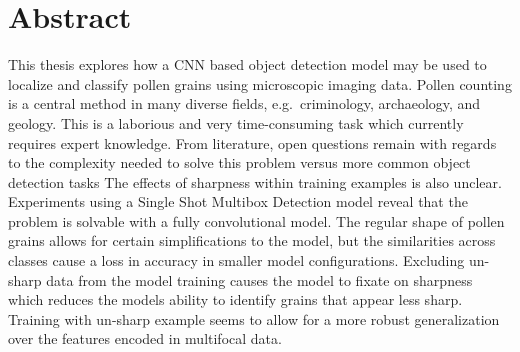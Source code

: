 \chapter*{Abstract}
This thesis explores how a CNN based object detection model may be used to localize and classify pollen grains using microscopic imaging data.
Pollen counting is a central method in many diverse fields, e.g.\ criminology, archaeology, and geology.
This is a laborious and very time-consuming task which currently requires expert knowledge.
From literature, open questions remain with regards to the complexity needed to solve this problem versus more common object detection tasks
The effects of sharpness within training examples is also unclear.
Experiments using a Single Shot Multibox Detection model reveal that the problem is solvable with a fully convolutional model.
The regular shape of pollen grains allows for certain simplifications to the model, but the similarities across classes cause a loss in accuracy in smaller model configurations.
Excluding un-sharp data from the model training causes the model to fixate on sharpness which reduces the models ability to identify grains that appear less sharp.
Training with un-sharp example seems to allow for a more robust generalization over the features encoded in multifocal data.


